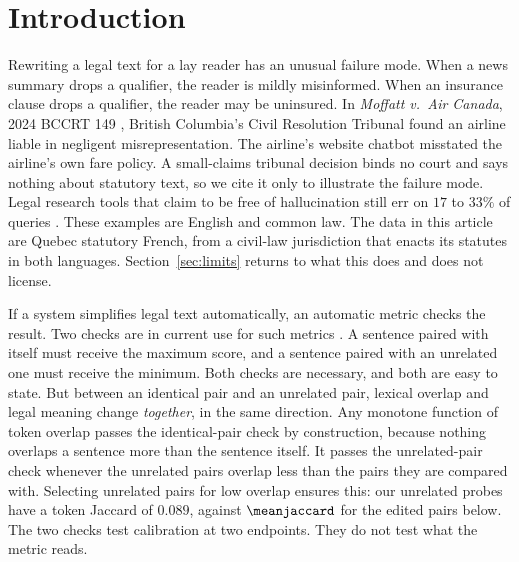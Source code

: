 \documentclass{BVP_JCLLT}
\newcommand{\rev}[1]{#1}
\newcommand{\rev}[1]{{\color{revcol}#1}}
\begin{document}
\section{Introduction}\label{sec:intro}

\rev{Rewriting a legal text for a lay reader has an unusual failure mode. When a
news summary drops a qualifier, the reader is mildly misinformed. When an
insurance clause drops a qualifier, the reader may be uninsured. In
\emph{Moffatt v.\ Air Canada}, 2024 BCCRT 149 \cite{moffatt2024}, British
Columbia's Civil Resolution Tribunal found an airline liable in negligent
misrepresentation. The airline's website chatbot misstated the airline's own
fare policy. A small-claims tribunal decision binds no court and says nothing
about statutory text, so we cite it only to illustrate the failure mode. Legal
research tools that claim to be free of hallucination still err on $17$ to
$33\%$ of queries \cite{magesh2025hallucinationfree}. These examples are English and
common law. The data in this article are Quebec statutory French, from a
civil-law jurisdiction that enacts its statutes in both languages.
Section~\ref{sec:limits} returns to what this does and does not license.}

\rev{If a system simplifies legal text automatically, an automatic metric checks
the result. Two checks are in current use for such metrics
\cite{beauchemin2023meaningbert, beauchemin2025judgebert}. A sentence paired with
itself must receive the maximum score, and a sentence paired with an unrelated
one must receive the minimum. Both checks are necessary, and both are easy to
state. But between an identical pair and an unrelated pair, lexical overlap and
legal meaning change \emph{together}, in the same direction. Any monotone
function of token overlap passes the identical-pair check by construction,
because nothing overlaps a sentence more than the sentence itself. It passes the
unrelated-pair check whenever the unrelated pairs overlap less than the pairs
they are compared with. Selecting unrelated pairs for low overlap ensures this:
our unrelated probes have a token Jaccard of $0.089$, against $\meanjaccard$ for
the edited pairs below. The two checks test calibration at two endpoints. They do
not test what the metric reads.}
\end{document}
